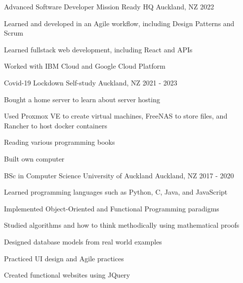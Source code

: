 

\begin{cventries}

  \cventry
    {Advanced Software Developer}
    {Mission Ready HQ}
    {Auckland, NZ}
    {2022}
    {
      \begin{cvitems}
        \item {Learned and developed in an Agile workflow, including Design Patterns and Scrum}
        \item {Learned fullstack web development, including React and APIs}
        \item {Worked with IBM Cloud and Google Cloud Platform}
      \end{cvitems}
    }

  \cventry
    {Covid-19 Lockdown}
    {Self-study}
    {Auckland, NZ}
    {2021 - 2023}
    {
      \begin{cvitems}
        \item {Bought a home server to learn about server hosting}
        \item {Used Proxmox VE to create virtual machines, FreeNAS to store files, and Rancher to host docker containers}
        \item {Reading various programming books}
        \item {Built own computer}
      \end{cvitems}
    }

  \cventry
    {BSc in Computer Science} %
    {University of Auckland} %
    {Auckland, NZ} %
    {2017 - 2020} %
    {
      \begin{cvitems} %
        \item {Learned programming languages such as Python, C, Java, and JavaScript} 
        \item {Implemented Object-Oriented and Functional Programming paradigms}
        \item {Studied algorithms and how to think methodically using mathematical proofs}
        \item {Designed database models from real world examples}
        \item {Practiced UI design and Agile practices}
        \item {Created functional websites using JQuery}
      \end{cvitems}
    }

\end{cventries}
